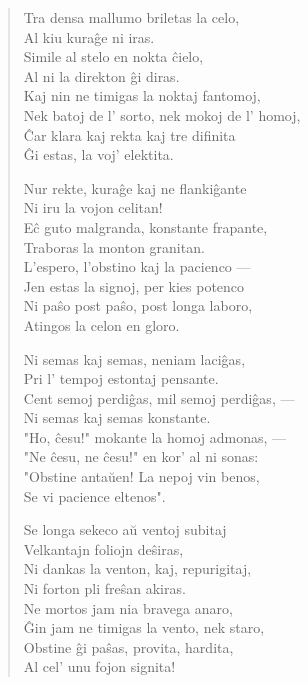 \begin{verse}
                 \vin   Tra densa mallumo briletas la celo,\\
                Al kiu kura\^ge ni iras.\\
                Simile al stelo en nokta \^cielo,\\
                Al ni la direkton \^gi diras.\\
                Kaj nin ne timigas la noktaj fantomoj,\\
                Nek batoj de l' sorto, nek mokoj de l' homoj,\\
                \^Car klara kaj rekta kaj tre difinita\\
                \^Gi estas, la voj' elektita.

                 \vin   Nur rekte, kura\^ge kaj ne flanki\^gante\\
                Ni iru la vojon celitan!\\
                E\^c guto malgranda, konstante frapante,\\
                Traboras la monton granitan.\\
                L'espero, l'obstino kaj la pacienco ---\\
                Jen estas la signoj, per kies potenco\\
                Ni pa\^so post pa\^so, post longa laboro,\\
                Atingos la celon en gloro.

                 \vin   Ni semas kaj semas, neniam laci\^gas,\\
                Pri l' tempoj estontaj pensante.\\
                Cent semoj perdi\^gas, mil semoj perdi\^gas, ---\\
                Ni semas kaj semas konstante.\\
                "Ho, \^cesu!" mokante la homoj admonas, ---\\
                "Ne \^cesu, ne \^cesu!" en kor' al ni sonas:\\
                "Obstine anta\u uen! La nepoj vin benos,\\
                Se vi pacience eltenos".

                 \vin   Se longa sekeco a\u u ventoj subitaj\\
                Velkantajn foliojn de\^siras,\\
                Ni dankas la venton, kaj, repurigitaj,\\
                Ni forton pli fre\^san akiras.\\
                Ne mortos jam nia bravega anaro,\\
                \^Gin jam ne timigas la vento, nek staro,\\
                Obstine \^gi pa\^sas, provita, hardita,\\
                Al cel' unu fojon signita!


\end{verse}
